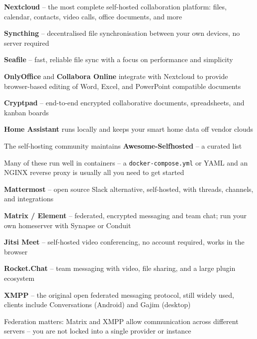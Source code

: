 \documentclass[Screen16to9,17pt]{foils}
\begin{document}
\begin{list2}
\item {\bf Nextcloud} -- the most complete self-hosted collaboration platform:
files, calendar, contacts, video calls, office documents, and more 
\item {\bf Syncthing} -- decentralised file synchronisation between your own devices,
no server required 
\item {\bf Seafile} -- fast, reliable file sync with a focus on performance and simplicity 
\item {\bf OnlyOffice} and {\bf Collabora Online} integrate with Nextcloud to provide
browser-based editing of Word, Excel, and PowerPoint compatible documents
\item {\bf Cryptpad} -- end-to-end encrypted collaborative documents, spreadsheets,
and kanban boards 
\item {\bf Home Assistant} runs locally and keeps your smart
home data off vendor clouds 
\item The self-hosting community maintains {\bf Awesome-Selfhosted} --
a curated list 
\item Many of these run well in containers -- a \verb+docker-compose.yml+ or YAML and an NGINX reverse proxy is usually all you need to get started
\end{list2}



\begin{list2}
\item {\bf Mattermost} -- open source Slack alternative, self-hosted,
with threads, channels, and integrations 
\item {\bf Matrix / Element} -- federated, encrypted messaging and team chat;
run your own homeserver with Synapse or Conduit 
\item {\bf Jitsi Meet} -- self-hosted video conferencing, no account required,
works in the browser 
\item {\bf Rocket.Chat} -- team messaging with video, file sharing,
and a large plugin ecosystem 
\item {\bf XMPP} -- the original open federated messaging protocol, still widely used,
clients include Conversations (Android) and Gajim (desktop)
\item Federation matters: Matrix and XMPP allow communication across different servers --
you are not locked into a single provider or instance
\end{list2}
\end{document}
